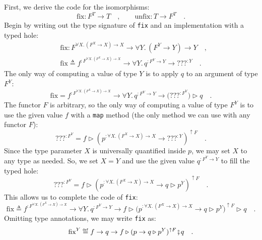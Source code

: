 First, we derive the code for the isomorphisms:
\[
\text{fix}:F^{T}\rightarrow T\quad,\quad\quad\text{unfix}:T\rightarrow F^{T}\quad.
\]
Begin by writing out the type signature of \lstinline!fix! and an
implementation with a typed hole:
\begin{align*}
 & \text{fix}:F^{\forall X.\,(F^{X}\rightarrow X)\rightarrow X}\rightarrow\forall Y.\,(F^{Y}\rightarrow Y)\rightarrow Y\quad,\\
 & \text{fix}\triangleq f^{:F^{\forall X.\,(F^{X}\rightarrow X)\rightarrow X}}\rightarrow\forall Y.\,q^{:F^{Y}\rightarrow Y}\rightarrow\text{???}^{:Y}\quad.
\end{align*}
The only way of computing a value of type $Y$ is to apply $q$ to
an argument of type $F^{Y}$:
\[
\text{fix}=f^{:F^{\forall X.\,(F^{X}\rightarrow X)\rightarrow X}}\rightarrow\forall Y.\,q^{:F^{Y}\rightarrow Y}\rightarrow\big(\text{???}^{:F^{Y}}\big)\triangleright q\quad.
\]
The functor $F$ is arbitrary, so the only way of computing a value
of type $F^{Y}$ is to use the given value $f$ with a \lstinline!map!
method (the only method we can use with any functor $F$):
\[
\text{???}^{:F^{Y}}=f\triangleright(p^{:\forall X.\,(F^{X}\rightarrow X)\rightarrow X}\rightarrow\text{???}^{:Y})^{\uparrow F}\quad.
\]
Since the type parameter $X$ is universally quantified inside $p$,
we may set $X$ to any type as needed. So, we set $X=Y$ and use the
given value $q^{:F^{Y}\rightarrow Y}$ to fill the typed hole:
\[
\text{???}^{:F^{Y}}=f\triangleright(p^{:\forall X.\,(F^{X}\rightarrow X)\rightarrow X}\rightarrow q\triangleright p^{Y})^{\uparrow F}\quad.
\]
This allows us to complete the code of \lstinline!fix!:
\[
\text{fix}\triangleq f^{:F^{\forall X.\,(F^{X}\rightarrow X)\rightarrow X}}\rightarrow\forall Y.\,q^{:F^{Y}\rightarrow Y}\rightarrow f\triangleright\big(p^{:\forall X.\,(F^{X}\rightarrow X)\rightarrow X}\rightarrow q\triangleright p^{Y}\big)^{\uparrow F}\triangleright q\quad.
\]
Omitting type annotations, we may write \lstinline!fix! as:
\begin{equation}
\text{fix}^{Y}\triangleq f\rightarrow q\rightarrow f\triangleright(p\rightarrow q\triangleright p^{Y})^{\uparrow F}\bef q\quad.\label{eq:definition-of-fix}
\end{equation}

